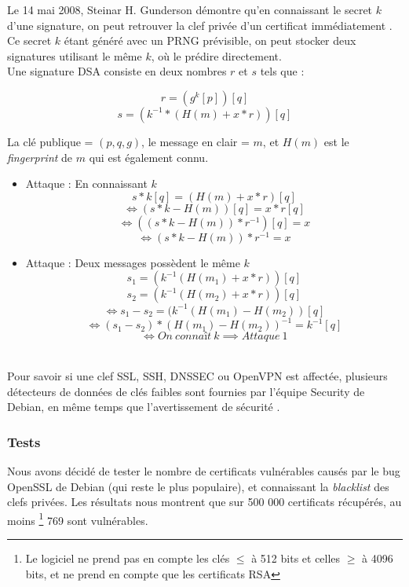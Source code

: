 			Le 14 mai 2008, Steinar H. Gunderson démontre qu'en connaissant le secret $k$ d'une signature, on peut retrouver la clef privée d'un certificat immédiatement \cite{gunderson2008}. Ce secret $k$ étant généré avec un PRNG prévisible, on peut stocker deux signatures utilisant le même $k$, où le prédire directement.\\
		
			Une signature DSA consiste en deux nombres $r$ et $s$ tels que :
			
			$$r = (g^k [p]) [q]$$
			$$s = (k^{-1} * (H(m) + x * r)) [q]$$
		
			La clé publique = $(p, q, g)$, le message en clair = $m$, et $H(m)$ est le \textit{fingerprint} de $m$ qui est également connu.
		
			\begin{itemize}
			\item Attaque  : En connaissant $k$
			$$s * k [q] = (H(m) + x*r) [q]$$
			$$\iff (s * k - H(m)) [q] = x*r [q]$$
			$$\iff ((s*k - H(m))*r^{-1})[q] = x$$
			$$\iff (s*k - H(m))*r^{-1} = x$$
	
			\item Attaque  : Deux messages possèdent le même $k$
			$$s_1 = (k^{-1} (H(m_1) + x*r)) [q]$$
			$$s_2 = (k^{-1} (H(m_2) + x*r)) [q]$$
			$$\iff s_1 - s_2 = (k^{-1} (H(m_1) - H(m_2)) [q]$$
			$$\iff (s_1 - s_2)*(H(m_1) - H(m_2))^{-1} = k^{-1} [q]$$
			$$\iff On\ connaît\ k \implies Attaque\ 1$$\\
			\end{itemize}
	
			Pour savoir si une clef SSL, SSH, DNSSEC ou OpenVPN est affectée, plusieurs détecteurs de données \cite{dowkd.pl} \cite{openssl-blacklist} de clés faibles sont fournies par l'équipe Security de Debian, en même temps que l'avertissement de sécurité \cite{debian2008bug}.\\ 
	
		\subsubsection{Tests}
	
			Nous avons décidé de tester le nombre de certificats vulnérables causés 	par le bug OpenSSL de Debian (qui reste le plus populaire), et connaissant la \textit{blacklist} des clefs privées. Les résultats nous montrent que sur 500 000 certificats récupérés, au moins \footnote{Le logiciel ne prend pas en compte les clés $\leq$ à 512 bits et celles $\geq$ à 4096 bits, et ne prend en compte que les certificats RSA} 769 sont vulnérables.\\
			
